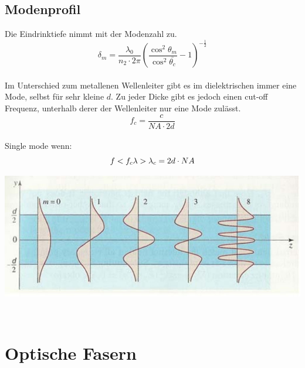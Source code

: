 \subsection{Modenprofil}
Die Eindrinktiefe nimmt mit der Modenzahl zu.\\
\[
	\delta_m=\frac{\lambda_0}{n_2 \cdot 2\pi}\left( \frac{\cos^2\theta_m}{\cos^2 \bar{\theta_c}} -1  \right)^{-\frac{1}{2}}
\]
\\
Im Unterschied zum metallenen Wellenleiter gibt es im dielektrischen immer eine Mode, selbst für sehr kleine $d$. Zu jeder Dicke gibt es jedoch einen cut-off Frequenz, unterhalb derer der Wellenleiter nur eine Mode zulässt.\\
\[
	f_c=\frac{c}{NA\cdot 2d}
\]
\\
Single mode wenn:
\[
	f<f_c \\
	\lambda > \lambda_c=2d\cdot NA
\]
\begin{center}
	\includegraphics[scale = 0.2]{images/modenprofil.jpg}
\end{center}
\
\section{Optische Fasern}
